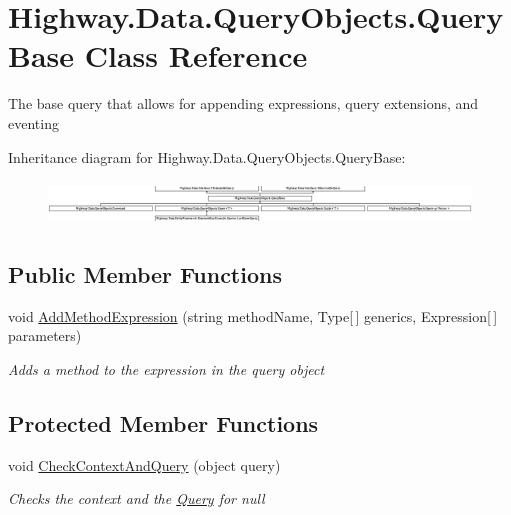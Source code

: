 \hypertarget{class_highway_1_1_data_1_1_query_objects_1_1_query_base}{\section{Highway.\-Data.\-Query\-Objects.\-Query\-Base Class Reference}
\label{class_highway_1_1_data_1_1_query_objects_1_1_query_base}
}


The base query that allows for appending expressions, query extensions, and eventing  


Inheritance diagram for Highway.\-Data.\-Query\-Objects.\-Query\-Base\-:\begin{figure}[H]
\begin{center}
\leavevmode
\includegraphics[height=1.183932cm]{class_highway_1_1_data_1_1_query_objects_1_1_query_base}
\end{center}
\end{figure}
\subsection*{Public Member Functions}
\begin{DoxyCompactItemize}
\item 
void \hyperlink{class_highway_1_1_data_1_1_query_objects_1_1_query_base_ace7c9da4af343caab20f5fdd38b47557}{Add\-Method\-Expression} (string method\-Name, Type\mbox{[}$\,$\mbox{]} generics, Expression\mbox{[}$\,$\mbox{]} parameters)
\begin{DoxyCompactList}\small\item\em Adds a method to the expression in the query object \end{DoxyCompactList}\end{DoxyCompactItemize}
\subsection*{Protected Member Functions}
\begin{DoxyCompactItemize}
\item 
void \hyperlink{class_highway_1_1_data_1_1_query_objects_1_1_query_base_a2abee86dc5bd2bfa2463c343e7574dfb}{Check\-Context\-And\-Query} (object query)
\begin{DoxyCompactList}\small\item\em Checks the context and the \hyperlink{class_highway_1_1_data_1_1_query_objects_1_1_query-g}{Query} for null \end{DoxyCompactList}\end{DoxyCompactItemize}
